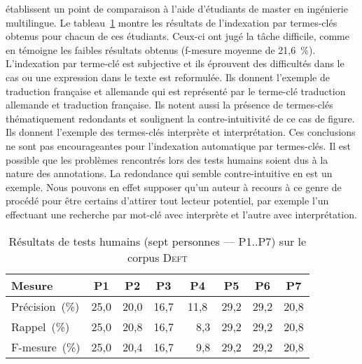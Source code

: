      établissent un point de comparaison à l'aide
    d'étudiants de master en ingénierie multilingue. Le
    tableau~\ref{tab:deft_human_tests} montre les résultats de l'indexation par
    termes-clés obtenus pour chacun de ces étudiants. Ceux-ci ont jugé la tâche
    difficile, comme en témoigne les faibles résultats obtenus (f-mesure moyenne
    de 21,6~\%). L'indexation par terme-clé est subjective et ils éprouvent des
    difficultés dans le cas ou une expression dans le texte est reformulée. Ils
    donnent l'exemple de \og{}traduction française et allemande\fg{} qui est
    représenté par le terme-clé \og{}traduction allemande et traduction
    française\fg{}. Ils notent aussi la présence de termes-clés thématiquement
    redondants et soulignent la contre-intuitivité de ce cas de figure. Ils
    donnent l'exemple des termes-clés \og{}interprète\fg{} et
    \og{}interprétation\fg{}. Ces conclusions ne sont pas encourageantes pour
    l'indexation automatique par termes-clés. Il est possible que les problèmes
    rencontrés lors des tests humains soient dus à la nature des annotations. La
    redondance qui semble contre-intuitive en est un exemple. Nous pouvons en
    effet supposer qu'un auteur à recours à ce genre de procédé pour être
    certains d'attirer tout lecteur potentiel, par exemple l'un effectuant une
    recherche par mot-clé avec \og{}interprète\fg{} et l'autre avec
    \og{}interprétation\fg{}.
    \begin{table}[!h]
      \centering
      \begin{tabular}{l|ccccccc}
        \toprule
          \textbf{Mesure} & \textbf{P1} & \textbf{P2} & \textbf{P3} & \textbf{P4} & \textbf{P5} & \textbf{P6} & \textbf{P7}\\
        \hline
        Précision~\hfill(\%) & 25,0 & 20,0 & 16,7 & 11,8 & 29,2 & 29,2 & 20,8\\
        Rappel~\hfill(\%) & 25,0 & 20,8 & 16,7 & ~~8,3 & 29,2 & 29,2 & 20,8\\
        F-mesure~\hfill(\%) & 25,0 & 20,4 & 16,7 & ~~9,8 & 29,2 & 29,2 & 20,8\\
        \bottomrule
      \end{tabular}
      \caption[Résultats de tests humains sur le corpus \textsc{Deft}]{
        Résultats de tests humains (sept personnes --- P1$..$P7) sur le corpus
        \textsc{Deft}
        \label{tab:deft_human_tests}
      }
    \end{table}


